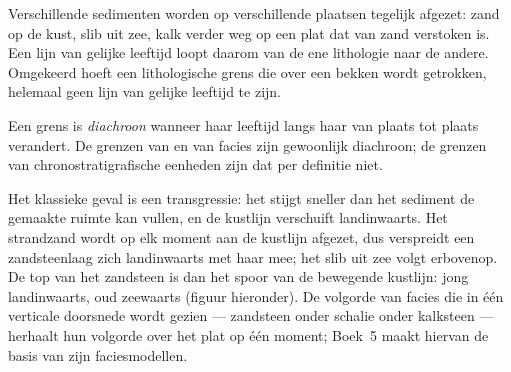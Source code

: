 Verschillende sedimenten worden op verschillende plaatsen tegelijk afgezet: zand op de kust, slib uit zee, kalk verder weg op een plat dat van zand verstoken is. Een lijn van gelijke leeftijd loopt daarom van de ene lithologie naar de andere. Omgekeerd hoeft een lithologische grens die over een bekken wordt getrokken, helemaal geen lijn van gelijke leeftijd te zijn.

\begin{definition}\label{def:b1:stratigraphic-scale:diachronous}
Een grens is \emph{diachroon} wanneer haar leeftijd langs haar van plaats tot plaats verandert. De grenzen van  en van facies zijn gewoonlijk diachroon; de grenzen van chronostratigrafische eenheden zijn dat per definitie niet.
\end{definition}

Het klassieke geval is een transgressie: het  stijgt sneller dan het sediment de gemaakte ruimte kan vullen, en de kustlijn verschuift landinwaarts. Het strandzand wordt op elk moment aan de kustlijn afgezet, dus verspreidt een zandsteenlaag zich landinwaarts met haar mee; het slib uit zee volgt erbovenop. De top van het zandsteen is dan het spoor van de bewegende kustlijn: jong landinwaarts, oud zeewaarts (figuur hieronder). De volgorde van facies die in één verticale doorsnede wordt gezien --- zandsteen onder schalie onder kalksteen --- herhaalt hun volgorde over het plat op één moment; Boek~5 maakt hiervan de basis van zijn faciesmodellen.

